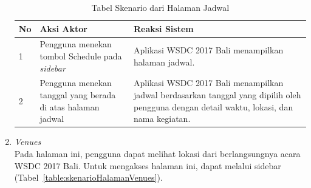 \begin{enumerate}
		\begin{table}[H]
			\centering
			\begin{tabular}{|p{0.5cm}|p{7cm}|p{7cm}|}
				\hline
				No & Aksi Aktor                               & Reaksi Sistem                                          \\ \hline
				1  & Pengguna menekan tombol Schedule pada \textit{sidebar} & Aplikasi WSDC 2017 Bali menampilkan halaman jadwal. \\ \hline
				2  & Pengguna menekan tanggal yang berada di atas halaman jadwal & Aplikasi WSDC 2017 Bali menampilkan jadwal berdasarkan tanggal yang dipilih oleh pengguna dengan detail waktu, lokasi, dan nama kegiatan. \\ \hline
			\end{tabular}
			\caption{Tabel Skenario dari Halaman Jadwal}
			\label{table:skenarioHalamanJadwal}
		\end{table}
	\item {\it Venues} \\ 
	Pada halaman ini, pengguna dapat melihat lokasi dari berlangsungnya acara WSDC 2017 Bali. Untuk mengakses halaman ini, dapat melalui sidebar (Tabel~\ref{table:skenarioHalamanVenues}).

\end{enumerate}
